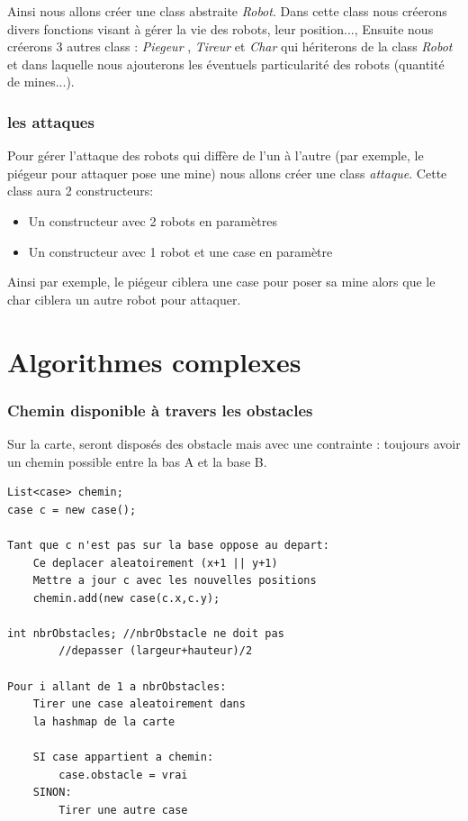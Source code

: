 \documentclass[12pt]{article}
\begin{document}
Ainsi nous allons créer une class abstraite \emph{Robot}. Dans cette class nous créerons divers fonctions visant à gérer la vie des robots, leur position...,
Ensuite nous créerons 3 autres class : \emph{Piegeur} , \emph{Tireur} et \emph{Char} qui hériterons de la class \emph{Robot} et dans laquelle nous ajouterons les éventuels particularité des robots (quantité de mines...).

\section{les attaques}
Pour gérer l'attaque des robots qui diffère de l'un à l'autre (par exemple, le piégeur pour attaquer pose une mine) nous allons créer une class \emph{attaque}.
Cette class aura 2 constructeurs:
\begin{itemize}
\item Un constructeur avec 2 robots en paramètres
\item Un constructeur avec 1 robot et une case en paramètre
\end{itemize}
Ainsi par exemple, le piégeur ciblera une case pour poser sa mine alors que le char ciblera un autre robot pour attaquer.

\newpage
{}
\part*{Algorithmes complexes}
\setcounter{section}{0}

\section{Chemin disponible à travers les obstacles}
Sur la carte, seront disposés des obstacle mais avec une contrainte : toujours avoir un chemin possible entre la bas A et la base B.
\\
\begin{lstlisting}
List<case> chemin;
case c = new case();

Tant que c n'est pas sur la base oppose au depart:
	Ce deplacer aleatoirement (x+1 || y+1)
	Mettre a jour c avec les nouvelles positions
	chemin.add(new case(c.x,c.y);

int nbrObstacles; //nbrObstacle ne doit pas 
		//depasser (largeur+hauteur)/2

Pour i allant de 1 a nbrObstacles:
	Tirer une case aleatoirement dans 
	la hashmap de la carte
	
	SI case appartient a chemin:
		case.obstacle = vrai
	SINON:
		Tirer une autre case
		
\end{lstlisting}
\newpage
\end{document}

